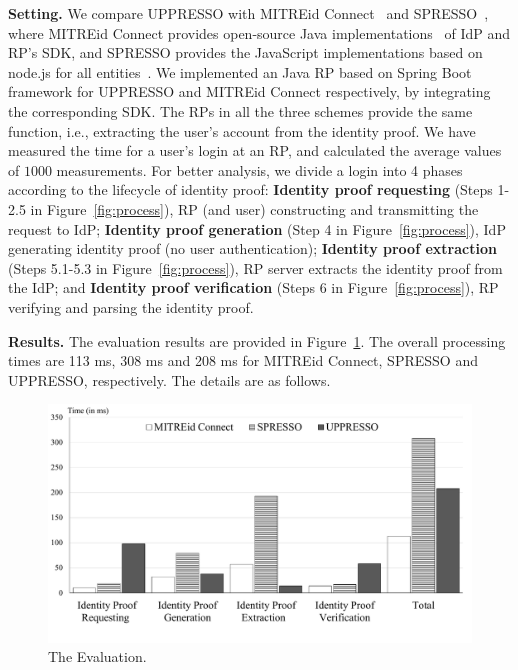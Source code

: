 \noindent\textbf{Setting.} 
We compare UPPRESSO with MITREid Connect~\cite{MITREid} and SPRESSO~\cite{SPRESSO}, where MITREid Connect provides open-source Java implementations~\cite{MITREid} of IdP and RP's SDK, and SPRESSO provides the JavaScript implementations based on node.js for all entities~\cite{SPRESSO}.
We implemented an Java RP based on Spring Boot framework for UPPRESSO and MITREid Connect respectively, by integrating the corresponding SDK.
The RPs in all the three schemes provide the same function, i.e.,   extracting the user's account from the identity proof. 
We have measured the time for a user's login at an RP, and calculated the average values of $1000$ measurements.
For better analysis, we divide a login into 4 phases according to the lifecycle of identity proof: \textbf{Identity proof requesting} (Steps 1-2.5 in Figure~\ref{fig:process}), RP (and user) constructing and transmitting the request to IdP; \textbf{Identity proof generation} (Step 4 in Figure~\ref{fig:process}), IdP generating identity proof (no user authentication); \textbf{Identity proof extraction} (Steps 5.1-5.3 in Figure~\ref{fig:process}), RP server extracts the identity proof from the IdP; and \textbf{Identity proof verification} (Steps 6 in Figure~\ref{fig:process}), RP verifying and parsing the identity proof.

\noindent\textbf{Results.}
The evaluation results are provided in Figure~\ref{fig:evaluation}. The overall processing times are  113 ms, 308 ms and 208 ms for MITREid Connect, SPRESSO and UPPRESSO, respectively. The details are as follows.

\begin{figure}
  \centering
  \includegraphics[width=\linewidth]{fig/evaluation2.pdf}
  \caption{The Evaluation.}
  \label{fig:evaluation}
\end{figure}

